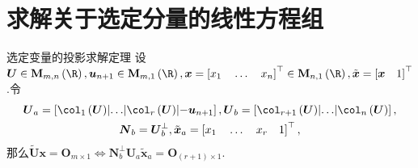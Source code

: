 \section{求解关于选定分量的线性方程组}

\begin{theorem}{选定变量的投影求解定理}{}
	设$\boldsymbol{U}\in\mathbf{M}_{m,n}\left(\R\right),\boldsymbol{u}_{n+1}\in\mathbf{M}_{m,1}\left(\R\right),\boldsymbol{x}=\left[x_{1}\quad\ldots\quad x_{n}\right]^{\top}\in\mathbf{M}_{n,1}\left(\R\right),\tilde{\boldsymbol{x}}=\left[\boldsymbol{x}\quad 1\right]^{\top}$.令
	\begin{gather*}
		\boldsymbol{U}_{a}=\left[\col_{1}\left(\boldsymbol{U}\right)\middle|\ldots\middle|\col_{r}\left(\boldsymbol{U}\right)\middle|-\boldsymbol{u}_{n+1}\right],\boldsymbol{U}_{b}=\left[\col_{r+1}\left(\boldsymbol{U}\right)\middle|\ldots\middle|\col_{n}\left(\boldsymbol{U}\right)\right],\\
		\boldsymbol{N}_{b}=\boldsymbol{U}_{b}^{\perp},
		\tilde{\boldsymbol{x}}_{a}=\left[x_{1}\quad\ldots\quad x_{r}\quad 1\right]^{\top},
	\end{gather*}
	那么$\tilde{\boldsymbol{U}}\boldsymbol{x}=\boldsymbol{O}_{m\times 1}\iff\boldsymbol{N}_{b}^{\perp}\boldsymbol{U}_{a}\tilde{\boldsymbol{x}}_{a}=\boldsymbol{O}_{\left(r+1\right)\times 1}$.
\end{theorem}